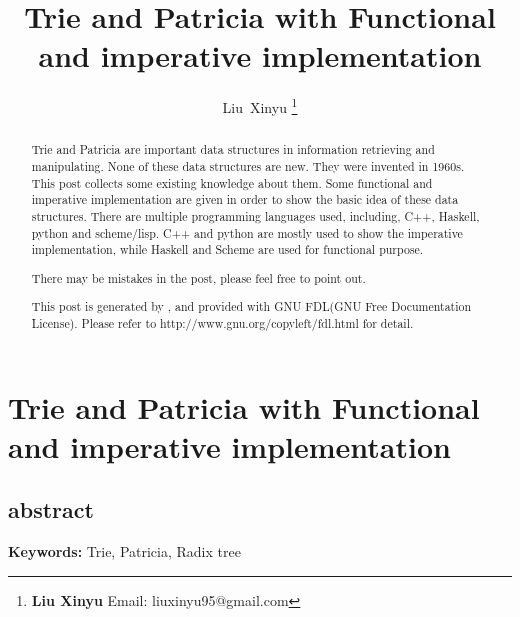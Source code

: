 \documentclass{article}
\begin{document}
\fi


\title{Trie and Patricia with Functional and imperative implementation}

\author{Liu~Xinyu
\thanks{{\bfseries Liu Xinyu } \newline
  Email: liuxinyu95@gmail.com \newline}
  }


\maketitle

\ifx\wholebook\relax
\chapter{Trie and Patricia with Functional and imperative implementation}

\section{abstract}
\else
\begin{abstract}
\fi
Trie and Patricia are important data structures in
information retrieving and manipulating. None of these data structures
are new. They were invented in 1960s. This post collects some
existing knowledge about them. Some functional and imperative
implementation are given in order to show the basic idea of these data structures.
There are multiple programming languages used, including, C++, Haskell, python and scheme/lisp.
C++ and python are mostly used to show the imperative implementation, while Haskell and Scheme are
used for functional purpose.

There may be mistakes in the post, please feel free to point out.

This post is generated by \LaTeXe, and provided with GNU FDL(GNU Free Documentation License).
Please refer to http://www.gnu.org/copyleft/fdl.html for detail.

\ifx\wholebook\relax\else
\end{abstract}
\fi

\vspace{3cm}
{\bfseries Keywords:} Trie, Patricia, Radix tree
\end{document}
